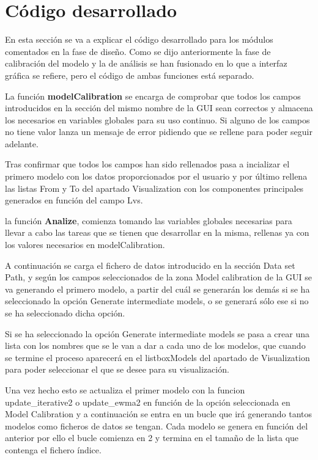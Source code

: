 \section{Código desarrollado}

En esta sección se va a explicar el código desarrollado para los módulos comentados en la fase de diseño. Como se dijo anteriormente la fase de calibración del modelo y la de análisis se han fusionado en lo que a interfaz gráfica se refiere, pero el código de ambas funciones está separado.

\bigskip

La función \textbf{modelCalibration} se encarga de comprobar que todos los campos introducidos en la sección del mismo nombre de la GUI sean correctos y almacena los necesarios en variables globales para su uso continuo. Si alguno  de los campos no tiene valor lanza un mensaje de error pidiendo que se rellene para poder seguir adelante.
\bigskip

Tras confirmar que todos los campos han sido rellenados pasa a incializar el primero modelo con los datos proporcionados por el usuario y por último rellena las listas From y To del apartado Visualization con los componentes principales generados en función del campo Lvs.
\bigskip


la función \textbf{Analize}, comienza tomando las variables globales necesarias para llevar a cabo las tareas que se tienen que desarrollar en la misma, rellenas ya con los valores necesarios en modelCalibration.

\bigskip

A continuación se carga el fichero de datos introducido en la sección Data set Path, y según los campos seleccionados de la zona Model calibration de la GUI se va generando el primero modelo, a partir del cuál se generarán los demás si se ha seleccionado la opción Generate intermediate models, o se generará sólo ese si no se ha seleccionado dicha opción.

\bigskip

Si se ha seleccionado la opción Generate intermediate models se pasa a crear una lista con los nombres que se le van a dar a cada uno de los modelos, que cuando se termine el proceso aparecerá en el listboxModels del apartado de Visualization para poder seleccionar el que se desee para su visualización.

\bigskip

Una vez hecho esto se actualiza el primer modelo con la funcion update\_iterative2 o update\_ewma2 en función de la opción seleccionada en Model Calibration y a continuación se entra en un bucle que irá generando tantos modelos como ficheros de datos se tengan. Cada modelo se genera en función del anterior por ello el bucle comienza en 2 y termina en el tamaño de la lista que contenga el fichero índice.

